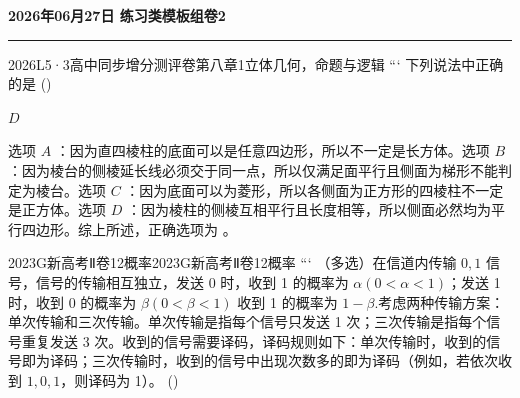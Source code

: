 \documentclass[12pt,UTF-8,a4paper]{ctexart}
\newcommand{\mytitle}{}
\numberwithin{figure}{section}
\theoremstyle{mystyle}
\theoremstyle{mystylekaishu}
\theoremstyle{mystyle}
\numberwithin{xiti}{section}
\begin{document}
\thispagestyle{plain} %
\renewcommand{\mytitle}{2026年06月27日 练习类模板组卷2}

\begin{center}
  {\Huge\bfseries\color{structure} \mytitle}
  \vspace{0.5em}
  
  \textcolor{structure}{\rule{\linewidth}{1.5pt}}
\end{center}
\vspace{1em}


\begin{problem}{2026}{L}{5·3高中同步增分测评卷第八章}{1}{立体几何，命题与逻辑}
```
下列说法中正确的是 (\hspace{1cm})
\begin{choices}
\end{choices}
\end{problem}

\begin{answer}
$D$
\end{answer}

\begin{solutions}
选项 $A$ ：因为直四棱柱的底面可以是任意四边形，所以不一定是长方体。选项 $B$ ：因为棱台的侧棱延长线必须交于同一点，所以仅满足面平行且侧面为梯形不能判定为棱台。选项 $C$ ：因为底面可以为菱形，所以各侧面为正方形的四棱柱不一定是正方体。选项 $D$ ：因为棱柱的侧棱互相平行且长度相等，所以侧面必然均为平行四边形。综上所述，正确选项为 。
\end{solutions}


\begin{problem}{2023}{G}{新高考Ⅱ卷}{12}{概率}{2023}{G}{新高考Ⅱ卷}{12}{概率}
```
（多选）在信道内传输 $0,1$ 信号，信号的传输相互独立，发送 0 时，收到 1 的概率为 $\alpha(0<\alpha<1)$；发送 1 时，收到 0 的概率为 $\beta(0<\beta<1)$ 收到 1 的概率为 $1-\beta$.考虑两种传输方案：单次传输和三次传输。单次传输是指每个信号只发送 1 次；三次传输是指每个信号重复发送 3 次。收到的信号需要译码，译码规则如下：单次传输时，收到的信号即为译码；三次传输时，收到的信号中出现次数多的即为译码（例如，若依次收到 $1,0,1$，则译码为 1）。 (\hspace{1cm})
\begin{choices}
\end{choices}
\end{problem}
\end{document}
